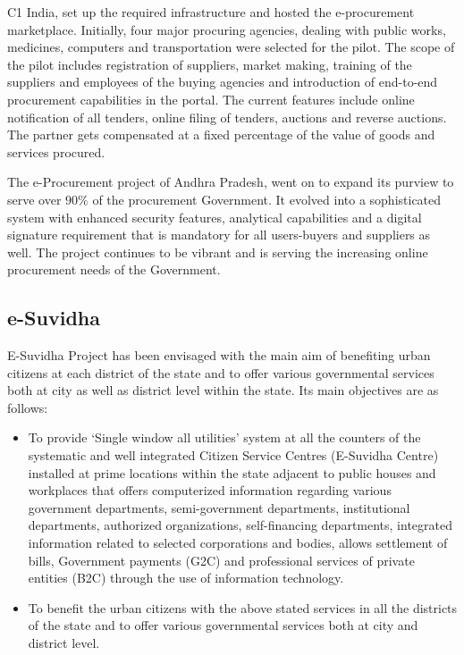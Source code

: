 C1 India, set up the required infrastructure and hosted the e-procurement marketplace. Initially, four major procuring agencies, dealing with public works, medicines, computers and transportation were selected for the pilot. The scope of the pilot includes registration of suppliers, market making, training of the suppliers and employees of the buying agencies and introduction of end-to-end procurement capabilities in the portal. The current features include online notification of all tenders, online filing of tenders, auctions and reverse auctions. The partner gets compensated at a fixed percentage of the value of goods and services procured.

The e-Procurement project of Andhra Pradesh, went on to expand its purview to serve over \(90\%\) of the procurement Government. It evolved into a sophisticated system with enhanced security features, analytical capabilities and a digital signature requirement that is mandatory for all users-buyers and suppliers as well. The project continues to be vibrant and is serving the increasing online procurement needs of the Government.

\subsection{e-Suvidha}
E-Suvidha Project has been envisaged with the main aim of benefiting urban citizens at each district of the state and to offer various governmental services both at city as well as district level within the state. Its main objectives are as follows:

\begin{itemize}
	\item To provide ‘Single window all utilities’ system at all the counters of the systematic and well integrated Citizen Service Centres (E-Suvidha Centre) installed at prime locations within the state adjacent to public houses and workplaces that offers computerized information regarding various government departments, semi-government departments, institutional departments, authorized organizations, self-financing departments, integrated information related to selected corporations and bodies, allows settlement of bills, Government payments (G2C) and  professional services of private entities (B2C) through the use of information technology.

	\item To benefit the urban citizens with the above stated services in all the districts of the state and to offer various governmental services both at city and district level.
\end{itemize}

